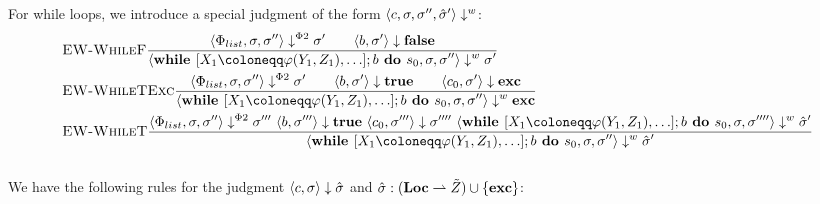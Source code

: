 For while loops, we introduce a special judgment of the form $\bigstepw{c}{\sigma, \sigma''}{\excstore'{}}$:
\begin{align*}
    &\bsrule{EW-WhileF}{\bigsteppr{\philist}{\store}{\store''}{\store'} \qquad
        \bigstep{b}{\store'}{\bfalse}}
    {\bigstepw{\defaultssawhile}{\store}{\store''}{\store'}}\\
    &\bsrule{EW-WhileTExc}{\bigsteppr{\philist}{\store}{\store''}{\store'} \qquad
        \bigstep{b}{\store'}{\btrue} \qquad 
    \bigstep{c_0}{\store'}{\exception}}
    {\bigstepw{\defaultssawhile}{\store}{\store''}{\exception}}\\
    &\bsrule{EW-WhileT}{\bigsteppr{\philist}{\store}{\store''}{\store'''} \ 
        \bigstep{b}{\store'''}{\btrue} \  
    \bigstep{c_0}{\store'''}{\store''''} \  
    \bigstepw{\defaultssawhile}{\store}{\store''''}{\excstore'}}
    {\bigstepw{\defaultssawhile}{\store}{\store''}{\excstore'}}\\
 \end{align*}
\\
We have the following rules for the judgment $\langle c, \sigma \rangle \downarrow \hat{\sigma}{}$
and $\hat{\sigma}{}: (\textbf{Loc} \rightharpoonup \tilde{Z}) \cup \{\textbf{exc}\}$:
